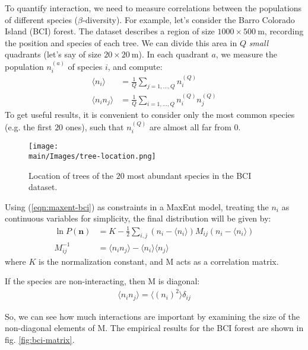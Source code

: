 \documentclass[../../main.tex]{subfiles}
\begin{document}
\medskip

To quantify interaction, we need to measure correlations between the populations of different species ($\beta$-diversity). For example, let's consider the Barro Colorado Island (BCI) forest. The dataset describes a region of size $\num{1000}\times\SI{500}{\m}$, recording the position and species of each tree. We can divide this area in $Q$ \textit{small} quadrants (let's say of size $\num{20}\times\SI{20}{\m}$). In each quadrant $a$, we measure the population $n_i^{(a)}$ of species $i$, and compute:
\begin{align}\label{eqn:maxent-bci}
    \langle n_i \rangle &= \frac{1}{Q} \sum_{j=1,\dots,Q} n_i^{(Q)}\\
    \langle n_i n_j \rangle &= \frac{1}{Q} \sum_{i=1,\dots,Q} n_i^{(Q)} n_j^{(Q)} \nonumber
\end{align}
To get useful results, it is convenient to consider only the most common species (e.g. the first $20$  ones), such that $n_i^{(Q)}$ are almost all far from $0$.

\begin{figure}[H]
    \centering
    \texttt{[image: \\main/Images/tree-location.png]}
    \caption{Location of trees of the $20$ most abundant species in the BCI dataset.}
    \label{fig:tree-location}
\end{figure}

Using (\ref{eqn:maxent-bci}) as constraints in a MaxEnt model, treating the $n_i$ as continuous variables for simplicity, the final distribution will be given by:
\begin{align*}
    \ln P(\bm{n}) &= K - \frac{1}{2} \sum_{i,j} (n_i - \langle n_i \rangle) M_{ij} (n_i - \langle n_i \rangle)\\
    M_{ij}^{-1} &= \langle n_i n_j \rangle - \langle n_i \rangle \langle n_j \rangle
\end{align*}
where $K$ is the normalization constant, and $\mathrm{M}$ acts as a correlation matrix. 

\medskip

If the species are non-interacting, then $\mathrm{M}$ is diagonal:
\begin{align*}
    \langle n_i n_j \rangle = \langle (n_i)^2 \rangle \delta_{ij}
\end{align*}

So, we can see how much interactions are important by examining the size of the non-diagonal elements of $\mathrm{M}$. The empirical results for the BCI forest are shown in fig. \ref{fig:bci-matrix}.
\end{document}
